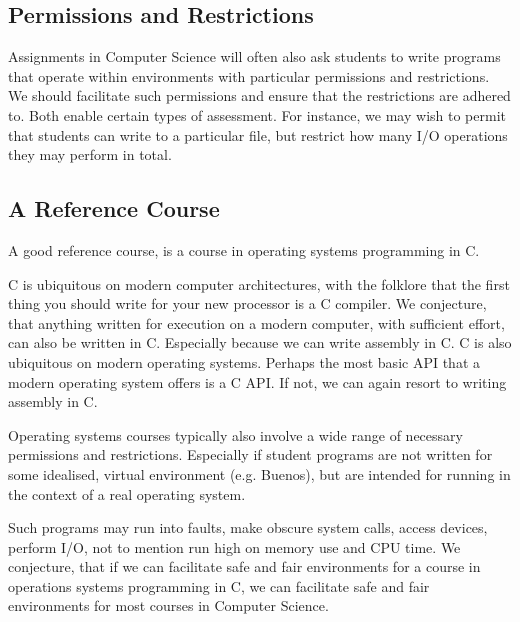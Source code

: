 \subsection{Permissions and Restrictions}

Assignments in Computer Science will often also ask students to write programs
that operate within environments with particular permissions and restrictions.
We should facilitate such permissions and ensure that the restrictions are
adhered to. Both enable certain types of assessment. For instance, we may wish
to permit that students can write to a particular file, but restrict how many
I/O operations they may perform in total.

\subsection{A Reference Course}

A good reference course, is a course in operating systems programming in C.

C is ubiquitous on modern computer architectures, with the folklore that the
first thing you should write for your new processor is a C compiler. We
conjecture, that anything written for execution on a modern computer, with
sufficient effort, can also be written in C. Especially because we can write
assembly in C. C is also ubiquitous on modern operating systems. Perhaps the
most basic API that a modern operating system offers is a C API. If not, we can
again resort to writing assembly in C.

Operating systems courses typically also involve a wide range of necessary
permissions and restrictions. Especially if student programs are not written
for some idealised, virtual environment (e.g. Buenos), but are intended for
running in the context of a real operating system.

Such programs may run into faults, make obscure system calls, access devices,
perform I/O, not to mention run high on memory use and CPU time. We conjecture,
that if we can facilitate safe and fair environments for a course in operations
systems programming in C, we can facilitate safe and fair environments for most
courses in Computer Science.
